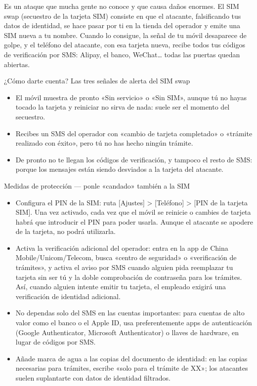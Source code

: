 
Es un ataque que mucha gente no conoce y que causa daños enormes. El SIM swap (secuestro de la tarjeta SIM) consiste en que el atacante, falsificando tus datos de identidad, se hace pasar por ti en la tienda del operador y emite una SIM nueva a tu nombre. Cuando lo consigue, la señal de tu móvil desaparece de golpe, y el teléfono del atacante, con esa tarjeta nueva, recibe todos tus códigos de verificación por SMS: Alipay, el banco, WeChat… todas las puertas quedan abiertas.

\begin{tcbinfo}{¿Cómo darte cuenta? Las tres señales de alerta del SIM swap}
\begin{itemize}
  \item El móvil muestra de pronto «Sin servicio» o «Sin SIM», aunque tú no hayas tocado la tarjeta y reiniciar no sirva de nada: suele ser el momento del secuestro.
  \item Recibes un SMS del operador con «cambio de tarjeta completado» o «trámite realizado con éxito», pero tú no has hecho ningún trámite.
  \item De pronto no te llegan los códigos de verificación, y tampoco el resto de SMS: porque los mensajes están siendo desviados a la tarjeta del atacante.
\end{itemize}

\end{tcbinfo}

\begin{tcbwarn}{Medidas de protección — ponle «candado» también a la SIM}
\begin{itemize}
  \item Configura el PIN de la SIM: ruta [Ajustes] > [Teléfono] > [PIN de la tarjeta SIM]. Una vez activado, cada vez que el móvil se reinicie o cambies de tarjeta habrá que introducir el PIN para poder usarla. Aunque el atacante se apodere de la tarjeta, no podrá utilizarla.
  \item Activa la verificación adicional del operador: entra en la app de China Mobile/Unicom/Telecom, busca «centro de seguridad» o «verificación de trámites», y activa el aviso por SMS cuando alguien pida reemplazar tu tarjeta sin ser tú y la doble comprobación de contraseña para los trámites. Así, cuando alguien intente emitir tu tarjeta, el empleado exigirá una verificación de identidad adicional.
  \item No dependas solo del SMS en las cuentas importantes: para cuentas de alto valor como el banco o el Apple ID, usa preferentemente apps de autenticación (Google Authenticator, Microsoft Authenticator) o llaves de hardware, en lugar de códigos por SMS.
  \item Añade marca de agua a las copias del documento de identidad: en las copias necesarias para trámites, escribe «solo para el trámite de XX»; los atacantes suelen suplantarte con datos de identidad filtrados.
\end{itemize}

\end{tcbwarn}


